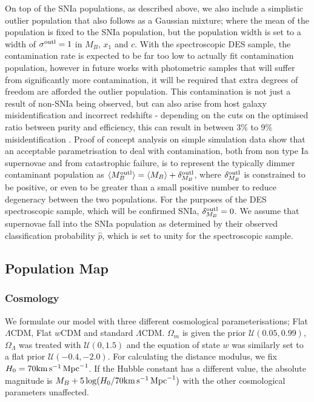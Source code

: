 \documentclass[a4paper,fleqn,usenatbib]{mnras}
\newcommand{\kmsmpc}{{\rm km}\,{\rm s}^{-1}\,{\rm Mpc}^{-1}}
\newcommand{\rubin}{\citetalias{Rubin2015}}
\begin{document}
On top of the SNIa populations, as described above, we also include a simplistic outlier population that also follows {\rubin} \citep[and therefore ][]{Kunz2007} as a Gaussian mixture; where the mean of the population is fixed to the SNIa population, but the population width is set to a width of $\sigma^{\rm outl} = 1$ in $M_B$, $x_1$ and $c$. With the spectroscopic DES sample, the contamination rate is expected to be far too low to actually fit contamination population, however in future works with photometric samples that will suffer from significantly more contamination, it will be required that extra degrees of freedom are afforded the outlier population. This contamination is not just a result of non-SNIa being observed, but can also arise from host galaxy misidentification and incorrect redshifts - depending on the cuts on the optimised ratio between purity and efficiency, this can result in between 3\% to 9\% misidentification  \citep{Gupta2016}. Proof of concept analysis on simple simulation data show that an acceptable parametrisation to deal with contamination, both from non type Ia supernovae and from catastrophic failure, is to represent the typically dimmer contaminant population as $\langle M_B^{\rm outl} \rangle = \langle M_B \rangle + \delta_{M_B}^{\rm outl}$, where $\delta_{M_B}^{\rm outl}$ is constrained to be positive, or even to be greater than a small positive number to reduce degeneracy between the two populations. For the purposes of the DES spectroscopic sample, which will be confirmed SNIa, $\delta_{M_B}^{\rm outl} =0$. We assume that supernovae fall into the SNIa population as determined by their observed classification probability $\hat{p}$, which is set to unity for the spectroscopic sample.


\subsection{Population Map}

\subsubsection{Cosmology}

We formulate our model with three different cosmological parameterisations; Flat $\Lambda$CDM, Flat $w$CDM and standard $\Lambda$CDM. $\Omega_m$ is given the prior $\mathcal{U}(0.05, 0.99)$, $\Omega_\Lambda$ was treated with $\mathcal{U}(0, 1.5)$ and the equation of state $w$ was similarly set to a flat prior $\mathcal{U}(-0.4, -2.0)$. For calculating the distance modulus, we fix $H_0 = 70 \kmsmpc $. If the Hubble constant has a different value, the absolute magnitude is $M_B + 5\log(H_0/70 \kmsmpc )$ with the other cosmological parameters unaffected.
\end{document}
